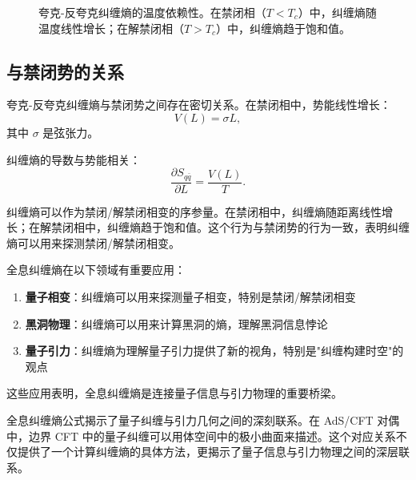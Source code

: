 \begin{figure}[htbp]
\centering
{}
\caption{夸克-反夸克纠缠熵的温度依赖性。在禁闭相（$T < T_c$）中，纠缠熵随温度线性增长；在解禁闭相（$T > T_c$）中，纠缠熵趋于饱和值。}
\label{fig:qq_temp}
\end{figure}

\subsection{与禁闭势的关系}

夸克-反夸克纠缠熵与禁闭势之间存在密切关系。在禁闭相中，势能线性增长：
\begin{equation}
    V(L) = \sigma L,
\end{equation}
其中 $\sigma$ 是弦张力。

纠缠熵的导数与势能相关：
\begin{equation}
    \frac{\partial S_{q\bar{q}}}{\partial L} = \frac{V(L)}{T}.
\end{equation}

\begin{remark}[纠缠熵作为序参量]
纠缠熵可以作为禁闭/解禁闭相变的序参量。在禁闭相中，纠缠熵随距离线性增长；在解禁闭相中，纠缠熵趋于饱和值。这个行为与禁闭势的行为一致，表明纠缠熵可以用来探测禁闭/解禁闭相变。
\end{remark}

\begin{note}[全息纠缠熵的应用]
全息纠缠熵在以下领域有重要应用：
\begin{enumerate}
    \item \textbf{量子相变}：纠缠熵可以用来探测量子相变，特别是禁闭/解禁闭相变
    \item \textbf{黑洞物理}：纠缠熵可以用来计算黑洞的熵，理解黑洞信息悖论
    \item \textbf{量子引力}：纠缠熵为理解量子引力提供了新的视角，特别是"纠缠构建时空"的观点
\end{enumerate}
这些应用表明，全息纠缠熵是连接量子信息与引力物理的重要桥梁。
\end{note}

\begin{remark}[纠缠熵与量子纠缠的关系]
全息纠缠熵公式揭示了量子纠缠与引力几何之间的深刻联系。在 AdS/CFT 对偶中，边界 CFT 中的量子纠缠可以用体空间中的极小曲面来描述。这个对应关系不仅提供了一个计算纠缠熵的具体方法，更揭示了量子信息与引力物理之间的深层联系。
\end{remark}

